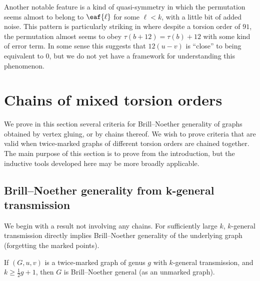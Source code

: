 \begin{rema}
    Another notable feature is a kind of quasi-symmetry in which the permutation seems almost to belong to $\eaf{\ell}$ for some $\ell<k$, with a little bit of added noise. This pattern is particularly striking in  where despite a torsion order of $91$, the permutation almost seems to obey $\tau(b+12) = \tau(b)+12$ with some kind of error term. In some sense this suggests that $12(u-v)$ is ``close'' to being equivalent to $0$, but we do not yet have a framework for understanding this phenomenon.
\end{rema}

\section{Chains of mixed torsion orders}
\label{sec:mixedTorsion}

We prove in this section several criteria for Brill--Noether generality of graphs obtained by vertex gluing, or by chains thereof. We wish to prove criteria that are valid when twice-marked graphs of different torsion orders are chained together. The main purpose of this section is to prove  from the introduction, but the inductive tools developed here may be more broadly applicable.

\subsection{Brill--Noether generality from k-general transmission}

We begin with a result not involving any chains. For sufficiently large $k$, $k$-general transmission directly implies Brill--Noether generality of the underlying graph (forgetting the marked points).

\begin{prop}\label{prop:kgt-bngenl}
If $(G,u,v)$ is a twice-marked graph of genus $g$ with $k$-general transmission, and $k \geq \frac12 g + 1$, then $G$ is Brill--Noether general (as an unmarked graph).
\end{prop}

